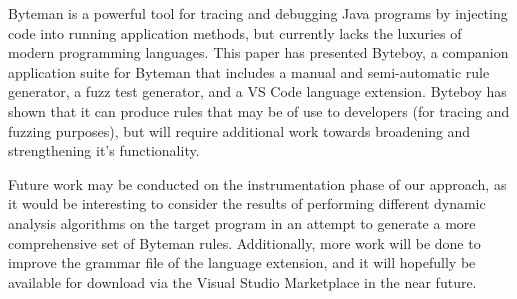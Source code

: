 \documentclass[letterpaper,twocolumn,10pt]{article}
\begin{document}
Byteman is a powerful tool for tracing and debugging Java programs by injecting code into running application methods, but currently lacks the luxuries of modern programming languages. This paper has presented Byteboy, a companion application suite for Byteman that includes a manual and semi-automatic rule generator, a fuzz test generator, and a VS Code language extension. Byteboy has shown that it can produce rules that may be of use to developers (for tracing and fuzzing purposes), but will require additional work towards broadening and strengthening it's functionality.

Future work may be conducted on the instrumentation phase of our approach, as it would be interesting to consider the results of performing different dynamic analysis algorithms on the target program in an attempt to generate a more comprehensive set of Byteman rules. Additionally, more work will be done to improve the grammar file of the language extension, and it will hopefully be available for download via the Visual Studio Marketplace in the near future.
\end{document}
